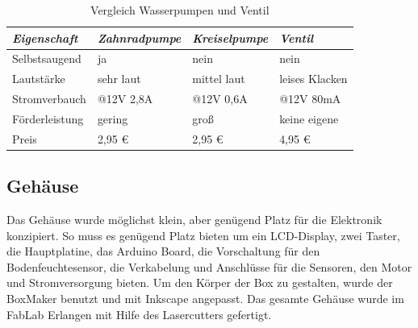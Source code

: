 \documentclass[]{IEEEtran}
\begin{document}
\begin{table}
	\centering
	\onehalfspacing
	
		\begin{tabular}{|l|lll|}
		\hline
		\textit{Eigenschaft} & \textit{Zahnradpumpe} & \textit{Kreiselpumpe} & \textit{Ventil} \\
		\hline
		Selbstsaugend	&ja	&nein &nein\\
		
		Lautstärke		&sehr laut	&mittel laut	&leises Klacken\\
		
		Stromverbauch	&@12V 2,8A	&@12V 0,6A	&@12V 80mA\\
		
		Förderleistung	&gering		&groß		&keine eigene\\
		
		Preis			&2,95 \euro	& 2,95 \euro	&	4,95 \euro\\
		\hline		
		\end{tabular}
		
	\caption{Vergleich Wasserpumpen und Ventil}
	\label{Vergleich zwischen Wasserpumpen und Ventil}

\end{table}	
	
	
	
	\subsection{Gehäuse}
	Das Gehäuse wurde möglichst klein, aber genügend Platz für die Elektronik konzipiert.
	So muss es genügend Platz bieten um ein LCD-Display, zwei Taster, die Hauptplatine, das Arduino Board,  die Vorschaltung für den Bodenfeuchtesensor, die Verkabelung und Anschlüsse für die Sensoren, den Motor und Stromversorgung  bieten.
	Um den Körper der Box zu gestalten, wurde der BoxMaker benutzt und mit Inkscape angepasst. 
	Das gesamte Gehäuse wurde im FabLab Erlangen mit Hilfe des Lasercutters gefertigt.
	
\end{document}
